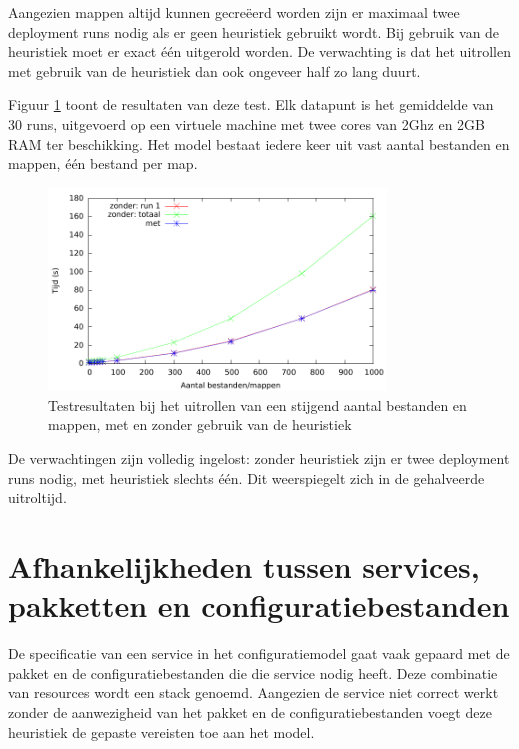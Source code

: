 Aangezien mappen altijd kunnen gecre\"eerd worden zijn er maximaal twee deployment runs nodig als er geen heuristiek gebruikt wordt.
Bij gebruik van de heuristiek moet er exact \'e\'en uitgerold worden.
De verwachting is dat het uitrollen met gebruik van de heuristiek dan ook ongeveer half zo lang duurt.

Figuur \ref{fig:file_dir_times} toont de resultaten van deze test.
Elk datapunt is het gemiddelde van 30 runs, uitgevoerd op een virtuele machine met twee cores van 2Ghz en 2GB RAM ter beschikking.
Het model bestaat iedere keer uit vast aantal bestanden en mappen, \'e\'en bestand per map.
\begin{figure}[h]
    \begin{center}
    \includegraphics[width=0.8\textwidth]{images/file_dir_times.pdf}
    \caption{Testresultaten bij het uitrollen van een stijgend aantal bestanden en mappen, met en zonder gebruik van de heuristiek}
    \label{fig:file_dir_times}
    \end{center}
\end{figure}

De verwachtingen zijn volledig ingelost: zonder heuristiek zijn er twee deployment runs nodig, met heuristiek slechts \'e\'en.
Dit weerspiegelt zich in de gehalveerde uitroltijd.

\section{Afhankelijkheden tussen services, pakketten en configuratiebestanden}
\label{sec:stacks_eval}
De specificatie van een service in het configuratiemodel gaat vaak gepaard met de pakket en de configuratiebestanden die die service nodig heeft.
Deze combinatie van resources wordt een stack genoemd.
Aangezien de service niet correct werkt zonder de aanwezigheid van het pakket en de configuratiebestanden voegt deze heuristiek de gepaste vereisten toe aan het model.


